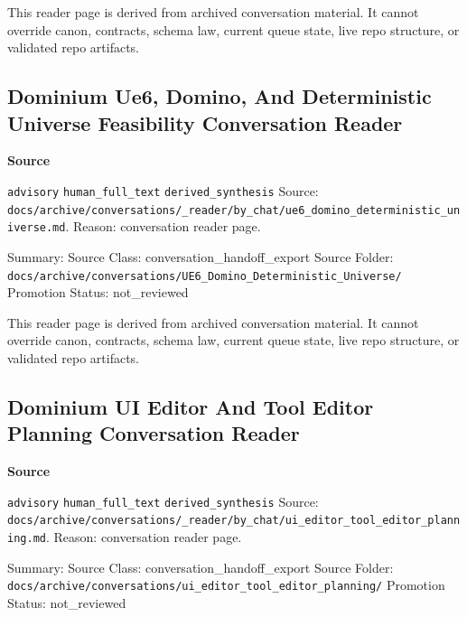 \documentclass[9pt,a4paper,openany]{book}
\newcommand{\vonecallout}[3]{\par\medskip\noindent\begingroup\setlength{\fboxsep}{7pt}\colorbox{DomCalloutBg}{\parbox{0.94\linewidth}{\textbf{\textcolor{#1}{#2}}\par #3}}\endgroup\par\medskip}
\begin{document}
This reader page is derived from archived conversation material.\allowbreak{} It cannot override canon, contracts, schema law, current queue state, live repo structure, or validated repo artifacts.\allowbreak{}



\subsection{Dominium Ue6, Domino, And Deterministic Universe Feasibility Conversation Reader}

\vonecallout{DomSlate}{Source}{\texttt{advisory} \texttt{human\_\allowbreak{}full\_\allowbreak{}text} \texttt{derived\_\allowbreak{}synthesis} Source: \texttt{docs/\allowbreak{}archive/\allowbreak{}conversations/\allowbreak{}\_\allowbreak{}reader/\allowbreak{}by\_\allowbreak{}chat/\allowbreak{}ue6\_\allowbreak{}domino\_\allowbreak{}deterministic\_\allowbreak{}universe.\allowbreak{}md}.\allowbreak{} Reason: conversation reader page.\allowbreak{}}

Summary: Source Class: conversation\_\allowbreak{}handoff\_\allowbreak{}export Source Folder: \texttt{docs/\allowbreak{}archive/\allowbreak{}conversations/\allowbreak{}UE6\_\allowbreak{}Domino\_\allowbreak{}Deterministic\_\allowbreak{}Universe/\allowbreak{}} Promotion Status: not\_\allowbreak{}reviewed


This reader page is derived from archived conversation material.\allowbreak{} It cannot override canon, contracts, schema law, current queue state, live repo structure, or validated repo artifacts.\allowbreak{}



\subsection{Dominium UI Editor And Tool Editor Planning Conversation Reader}

\vonecallout{DomSlate}{Source}{\texttt{advisory} \texttt{human\_\allowbreak{}full\_\allowbreak{}text} \texttt{derived\_\allowbreak{}synthesis} Source: \texttt{docs/\allowbreak{}archive/\allowbreak{}conversations/\allowbreak{}\_\allowbreak{}reader/\allowbreak{}by\_\allowbreak{}chat/\allowbreak{}ui\_\allowbreak{}editor\_\allowbreak{}tool\_\allowbreak{}editor\_\allowbreak{}planning.\allowbreak{}md}.\allowbreak{} Reason: conversation reader page.\allowbreak{}}

Summary: Source Class: conversation\_\allowbreak{}handoff\_\allowbreak{}export Source Folder: \texttt{docs/\allowbreak{}archive/\allowbreak{}conversations/\allowbreak{}ui\_\allowbreak{}editor\_\allowbreak{}tool\_\allowbreak{}editor\_\allowbreak{}planning/\allowbreak{}} Promotion Status: not\_\allowbreak{}reviewed
\end{document}
